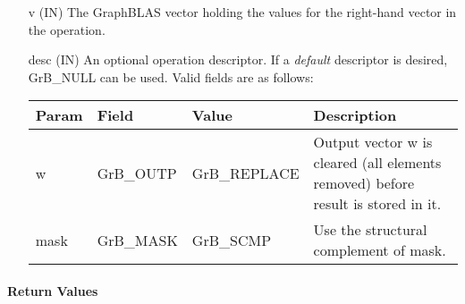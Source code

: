 \begin{itemize}[leftmargin=1.1in]
    \item[{\sf v}]     ({\sf IN}) The GraphBLAS vector holding the values for
    the right-hand vector in the operation.

    \item[{\sf desc}]  ({\sf IN}) An optional operation descriptor.  If a \emph{default}
    descriptor is desired, {\sf GrB\_NULL} can be used.  Valid fields are
    as follows: \\
    
    \begin{tabular}{lllp{2.5in}}
        Param & Field  & Value & Description \\
        \hline
        {\sf w}    & {\sf GrB\_OUTP} & {\sf GrB\_REPLACE} & Output vector {\sf w}
        is cleared (all elements removed) before result is stored in it. \\
        {\sf mask} & {\sf GrB\_MASK} & {\sf GrB\_SCMP}   & Use the structural
        complement of {\sf mask}. \\
    \end{tabular}
\end{itemize}

\paragraph{Return Values}

